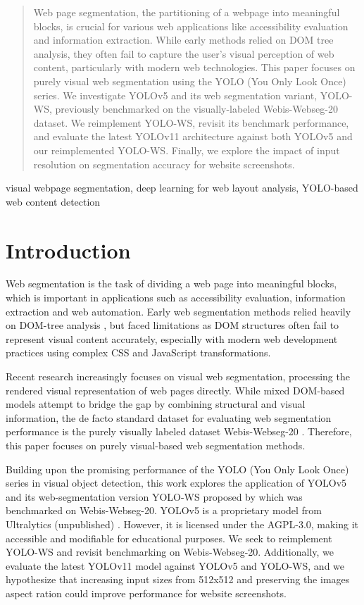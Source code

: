 \documentclass[conference]{IEEEtran}
\begin{document}
\begin{abstract}

Web page segmentation, the partitioning of a webpage into meaningful blocks, is crucial for various web applications like accessibility evaluation and information extraction. While early methods relied on DOM tree analysis, they often fail to capture the user's visual perception of web content, particularly with modern web technologies. This paper focuses on purely visual web segmentation using the YOLO (You Only Look Once) series. We investigate YOLOv5 and its web segmentation variant, YOLO-WS, previously benchmarked on the visually-labeled Webis-Webseg-20 dataset. We reimplement YOLO-WS, revisit its benchmark performance, and evaluate the latest YOLOv11 architecture against both YOLOv5 and our reimplemented YOLO-WS. Finally, we explore the impact of input resolution on segmentation accuracy for website screenshots.\\

\end{abstract}

\begin{IEEEkeywords}
visual webpage segmentation, deep learning for web layout analysis, YOLO-based web content detection
\end{IEEEkeywords}

\section{Introduction}
Web segmentation is the task of dividing a web page into meaningful blocks, which is important in applications such as accessibility evaluation, information extraction and web automation. Early web segmentation methods relied heavily on DOM-tree analysis \cite{VIPS, DOM-structure, HEPS}, but faced limitations as DOM structures often fail to represent visual content accurately, especially with modern web development practices using complex CSS and JavaScript transformations.

Recent research increasingly focuses on visual web segmentation, processing the rendered visual representation of web pages directly. While mixed DOM-based models attempt to bridge the gap by combining structural and visual information, the de facto standard dataset for evaluating web segmentation performance is the purely visually labeled dataset Webis-Webseg-20 \cite{kiesel:2020b}. Therefore, this paper focuses on purely visual-based web segmentation methods.

Building upon the promising performance of the YOLO (You Only Look Once) series in visual object detection, this work explores the application of YOLOv5 and its web-segmentation version YOLO-WS proposed by \cite{YOLO-WS} which was benchmarked on Webis-Webseg-20. YOLOv5 is a proprietary model from Ultralytics (unpublished) \cite{yolov5}. However, it is licensed under the AGPL-3.0, making it accessible and modifiable for educational purposes. We seek to reimplement YOLO-WS and revisit benchmarking on Webis-Webseg-20. Additionally, we evaluate the latest YOLOv11 model against YOLOv5 and YOLO-WS, and we hypothesize that increasing input sizes from 512x512 and preserving the images aspect ration could improve performance for website screenshots.
\end{document}
